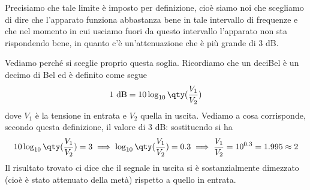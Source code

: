 
Precisiamo che tale limite è imposto per definizione, cioè siamo noi che scegliamo di dire che l'apparato funziona abbastanza bene in tale intervallo di frequenze e che nel momento in cui usciamo fuori da questo intervallo l'apparato non sta rispondendo bene, in quanto c'è un'attenuazione che è più grande di 3 dB.

Vediamo perché si sceglie proprio questa soglia. Ricordiamo che un deciBel è un decimo di Bel ed è definito come segue
\begin{equation*}
   1 \text{ dB}
   =10 \log_{10} \qty( \frac{V_1}{V_2} )
\end{equation*}
dove $V_1$ è la tensione in entrata e $V_2$ quella in uscita.
Vediamo a cosa corrisponde, secondo questa definizione, il valore di 3 dB: sostituendo si ha
\begin{equation*}
   10 \log_{10} \qty( \frac{V_1}{V_2} )=3
   \implies
   \log_{10} \qty( \frac{V_1}{V_2} )=0.3
   \implies
   \frac{V_1}{V_2}=10^{0.3}=1.995 \approx 2
\end{equation*}
Il risultato trovato ci dice che il segnale in uscita si è sostanzialmente dimezzato (cioè è stato attenuato della metà) rispetto a quello in entrata.

